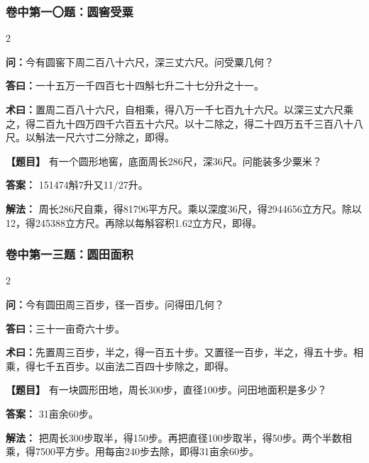 \documentclass[11pt,a4paper]{article}
\begin{document}
\subsubsection*{卷中第一〇题：圆窖受粟}
\begin{paracol}{2}
\begin{problemclassical}
\textbf{问：}今有圆窖下周二百八十六尺，深三丈六尺。问受粟几何？

\textbf{答曰：}一十五万一千四百七十四斛七升二十七分升之十一。

\textbf{术曰：}置周二百八十六尺，自相乘，得八万一千七百九十六尺。以深三丈六尺乘之，得二百九十四万四千六百五十六尺。以十二除之，得二十四万五千三百八十八尺。以斛法一尺六寸二分除之，即得。
\end{problemclassical}
\switchcolumn
\begin{problemmodern}
\textbf{【题目】} 有一个圆形地窖，底面周长286尺，深36尺。问能装多少粟米？

\textbf{答案：} 151474斛7升又11/27升。

\textbf{解法：} 周长286尺自乘，得81796平方尺。乘以深度36尺，得2944656立方尺。除以12，得245388立方尺。再除以每斛容积1.62立方尺，即得。
\end{problemmodern}
\end{paracol}

\vspace{0.3cm}

\subsubsection*{卷中第一三题：圆田面积}
\begin{paracol}{2}
\begin{problemclassical}
\textbf{问：}今有圆田周三百步，径一百步。问得田几何？

\textbf{答曰：}三十一亩奇六十步。

\textbf{术曰：}先置周三百步，半之，得一百五十步。又置径一百步，半之，得五十步。相乘，得七千五百步。以亩法二百四十步除之，即得。
\end{problemclassical}
\switchcolumn
\begin{problemmodern}
\textbf{【题目】} 有一块圆形田地，周长300步，直径100步。问田地面积是多少？

\textbf{答案：} 31亩余60步。

\textbf{解法：} 把周长300步取半，得150步。再把直径100步取半，得50步。两个半数相乘，得7500平方步。用每亩240步去除，即得31亩余60步。
\end{problemmodern}
\end{paracol}
\end{document}
